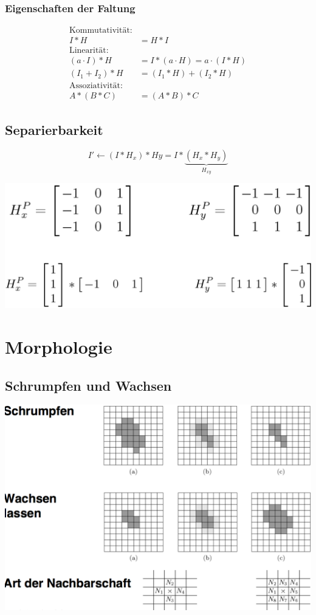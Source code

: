 \documentclass[10pt]{article}
\begin{document}
\subsubsection{Eigenschaften der Faltung}
\begin{align*}
 \text{Kommutativität:} \\
	I*H &= H * I \\
	\text{Linearität:} \\
	(a \cdot I) * H &= I * (a \cdot H) = a \cdot (I*H) \\
	(I_1 + I_2) * H &= (I_1 * H) + (I_2 * H) \\
	\text{Assoziativität:} \\
	A * (B * C) &= (A * B ) * C
\end{align*}

\subsection{Separierbarkeit}
\begin{equation*}
	I' \leftarrow (I*H_x)*Hy = I * \underbrace{(H_x*H_y)}_{H_{xy}}
\end{equation*}
\begin{center}
	\includegraphics[scale=0.2]{separierbarkeit.png}
\end{center}

\pagebreak
\section{Morphologie}

\subsection{Schrumpfen und Wachsen}
\begin{center}
	\includegraphics[scale=0.25]{schrumpfen-und-wachsen.png}
\end{center}
\end{document}

